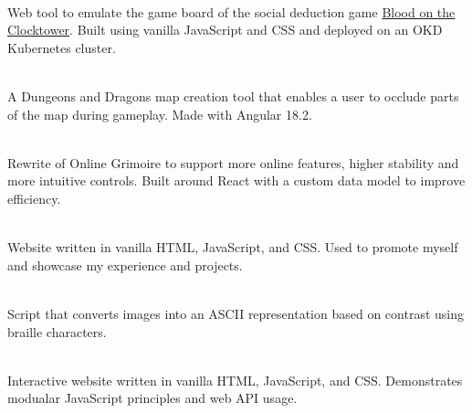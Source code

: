 \documentclass[10pt,a4paper,ragged2e,withhyper]{altacv}
\begin{document}

 \\\smallskip
Web tool to emulate the game board of the social deduction game \href{https://bloodontheclocktower.com/}{Blood on the Clocktower}\@. Built using vanilla JavaScript and CSS and deployed on an OKD Kubernetes cluster\@.

\divider{}

 \\\smallskip
A Dungeons and Dragons map creation tool that enables a user to occlude parts of the map during gameplay\@. Made with Angular 18.2\@.

\divider{}

 \\\smallskip
Rewrite of Online Grimoire to support more online features, 
higher stability and more intuitive controls\@. Built around
React with a custom data model to improve efficiency\@.

\divider{}

 \\\smallskip
Website written in vanilla HTML, JavaScript, and CSS\@.
Used to promote myself and showcase my experience
and projects\@.

\divider{}

 \\\smallskip
Script that converts images into an ASCII representation based
on contrast using braille characters\@.

\divider{}

 \\\smallskip
Interactive website written in vanilla HTML, JavaScript, and CSS\@.
Demonstrates modualar JavaScript principles and web API usage\@.

\smallskip



\\\smallskip
{}
\\\smallskip
{}
\end{document}
